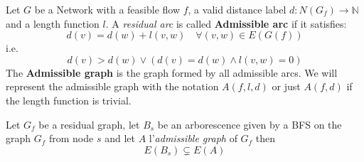 \begin{definition}
    \label{AdmissibleGraph}
    Let $G$ be a Network with a feasible flow $f$, a valid distance label $d: N(G_f) \rightarrow \mathbb{N}$ 
    and a length function $l$.
    A \textit{residual arc} is called \textbf{Admissible arc} if it satisfies:
    \[d(v) = d(w) + l(v,w) \quad \forall (v,w) \in E(G(f))\]
    i.e.
    \[d(v) > d(w) \lor (d(v) = d(w) \land l(v,w) = 0)\]
    The \textbf{Admissible graph} is the graph formed by all admissible arcs.
    We will represent the admissible graph with the notation $A(f,l,d)$ or just $A(f,d)$ if the length function is trivial.
\end{definition}


\begin{obs}{}{}
    Let $G_f$ be a residual graph, let $B_s$ be an arborescence given by a BFS on the graph $G_f$ from node $s$ and let $A$ l'\textit{admissible graph} of $G_f$ then
    \[E(B_s)\subsetneq E(A)\]
\end{obs}

